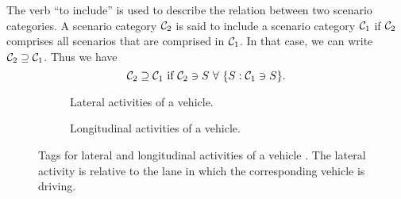 %	

The verb ``to include'' is used to describe the relation between two scenario categories. A scenario category $\mathcal{C}_{2}$ is said to include a scenario category $\mathcal{C}_{1}$ if $\mathcal{C}_{2}$ comprises all scenarios that are comprised in $\mathcal{C}_{1}$. In that case, we can write $\mathcal{C}_{2} \supseteq \mathcal{C}_{1}$. Thus we have
\begin{equation} \label{eq:scenario category include}
	\scenariocategoryb \includes \scenariocategorya \text{ if } \scenariocategoryb \comprises \scenario\,\,\forall\,\, \{S: \scenariocategorya \comprises \scenario\}.
\end{equation}

\begin{figure*}[t]
	\centering
	\begin{subfigure}{\linewidth}
		\centering
		\caption{Lateral activities of a vehicle.\vspace{1em}}
		\label{fig:tree vehicle lat act}
	\end{subfigure}
	\begin{subfigure}{\linewidth}
		\centering
		\caption{Longitudinal activities of a vehicle.}
		\label{fig:tree vehicle long act}
	\end{subfigure}
	\caption{Tags for lateral and longitudinal activities of a vehicle \autocite{degelder2019scenariocategories}. The lateral activity is relative to the lane in which the corresponding vehicle is driving.}
	\label{fig:tree vehicle activities}
\end{figure*}


